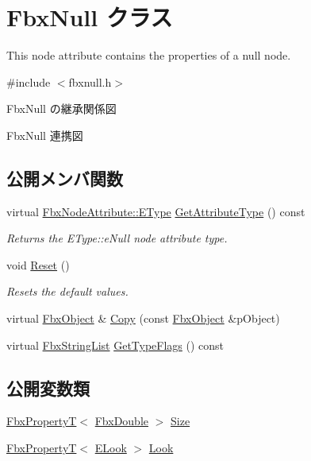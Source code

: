 \hypertarget{class_fbx_null}{}\section{Fbx\+Null クラス}
\label{class_fbx_null}


This node attribute contains the properties of a null node.  




{\ttfamily \#include $<$fbxnull.\+h$>$}



Fbx\+Null の継承関係図


Fbx\+Null 連携図
\subsection*{公開メンバ関数}
\begin{DoxyCompactItemize}
\item 
virtual \hyperlink{class_fbx_node_attribute_a08e1669d3d1a696910756ab17de56d6a}{Fbx\+Node\+Attribute\+::\+E\+Type} \hyperlink{class_fbx_null_a16b32e758ed2fe821e2c895526b71925}{Get\+Attribute\+Type} () const
\begin{DoxyCompactList}\small\item\em Returns the E\+Type\+::e\+Null node attribute type. \end{DoxyCompactList}\item 
void \hyperlink{class_fbx_null_add3bbcdc43864c3e8341c31e1cc68ec9}{Reset} ()
\begin{DoxyCompactList}\small\item\em Resets the default values. \end{DoxyCompactList}\item 
virtual \hyperlink{class_fbx_object}{Fbx\+Object} \& \hyperlink{class_fbx_null_a9427b6a7357d3c8adfc80279bc1db003}{Copy} (const \hyperlink{class_fbx_object}{Fbx\+Object} \&p\+Object)
\item 
virtual \hyperlink{class_fbx_string_list}{Fbx\+String\+List} \hyperlink{class_fbx_null_a48d35f4f24364e439f0d8a8e07c6d98f}{Get\+Type\+Flags} () const
\end{DoxyCompactItemize}
\subsection*{公開変数類}
\begin{DoxyCompactItemize}
\item 
\hyperlink{class_fbx_property_t}{Fbx\+PropertyT}$<$ \hyperlink{fbxtypes_8h_a171e72a1c46fc15c1a6c9c31948c1c5b}{Fbx\+Double} $>$ \hyperlink{class_fbx_null_a20a712e7191ecd9eb6570a4a50293a40}{Size}
\item 
\hyperlink{class_fbx_property_t}{Fbx\+PropertyT}$<$ \hyperlink{class_fbx_null_aa68cd0be1fca86a79ab603ee99505d78}{E\+Look} $>$ \hyperlink{class_fbx_null_a19a7ff9c2111b18702002f4728013278}{Look}
\end{DoxyCompactItemize}
